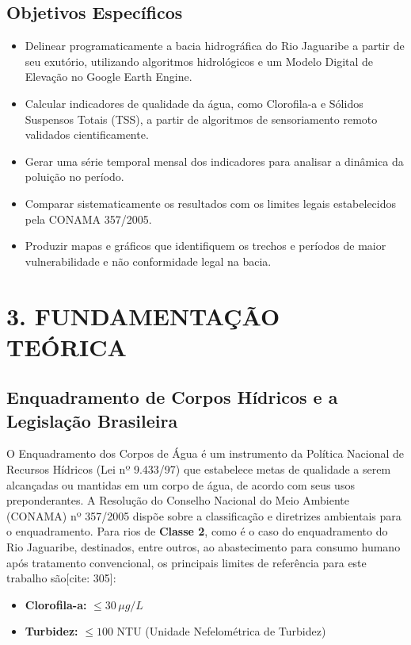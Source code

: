 \documentclass[12pt, a4paper]{article}
\begin{document}
\subsection*{Objetivos Específicos}
\begin{itemize}
    \item Delinear programaticamente a bacia hidrográfica do Rio Jaguaribe a partir de seu exutório, utilizando algoritmos hidrológicos e um Modelo Digital de Elevação no Google Earth Engine.
    \item Calcular indicadores de qualidade da água, como Clorofila-a e Sólidos Suspensos Totais (TSS), a partir de algoritmos de sensoriamento remoto validados cientificamente.
    \item Gerar uma série temporal mensal dos indicadores para analisar a dinâmica da poluição no período.
    \item Comparar sistematicamente os resultados com os limites legais estabelecidos pela CONAMA 357/2005.
    \item Produzir mapas e gráficos que identifiquem os trechos e períodos de maior vulnerabilidade e não conformidade legal na bacia.
\end{itemize}

\section*{3. FUNDAMENTAÇÃO TEÓRICA}

\subsection{Enquadramento de Corpos Hídricos e a Legislação Brasileira}
O Enquadramento dos Corpos de Água é um instrumento da Política Nacional de Recursos Hídricos (Lei nº 9.433/97) que estabelece metas de qualidade a serem alcançadas ou mantidas em um corpo de água, de acordo com seus usos preponderantes. A Resolução do Conselho Nacional do Meio Ambiente (CONAMA) nº 357/2005 dispõe sobre a classificação e diretrizes ambientais para o enquadramento. Para rios de \textbf{Classe 2}, como é o caso do enquadramento do Rio Jaguaribe, destinados, entre outros, ao abastecimento para consumo humano após tratamento convencional, os principais limites de referência para este trabalho são[cite: 305]:
\begin{itemize}
    \item \textbf{Clorofila-a:} $\leq 30 \, \mu g/L$
    \item \textbf{Turbidez:} $\leq 100$ NTU (Unidade Nefelométrica de Turbidez)
\end{itemize}
\end{document}
